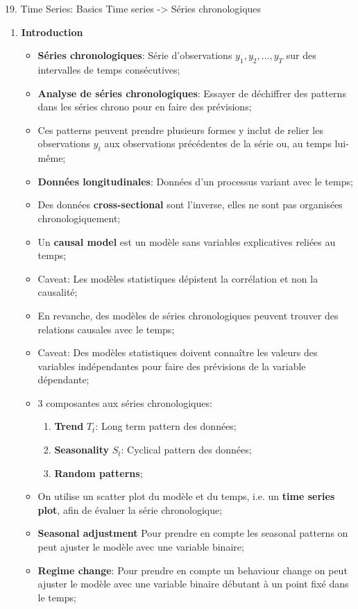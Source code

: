 \documentclass[12pt, titlepage, french]{report}
\begin{document}
\begin{CHPT_SUMM}{19. Time Series: Basics}
Time series -> Séries chronologiques
\begin{enumerate}
	\item	\textbf{Introduction}
	\begin{itemize}
		\item	\textbf{Séries chronologiques}: Série d'observations $y_{1}, y_{2}, \dots, y_{T}$ sur des intervalles de temps consécutives;
		\item	\textbf{Analyse de séries chronologiques}: Essayer de déchiffrer des patterns dans les séries chrono pour en faire des prévisions;
		\item[]	Ces patterns peuvent prendre plusieurs formes y inclut de relier les observations $y_{t}$ aux observations précédentes de la série ou, au temps lui-même;
		\item	\textbf{Données longitudinales}: Données d'un processus variant avec le temps;
		\item	Des données \textbf{cross-sectional} sont l'inverse, elles ne sont pas organisées chronologiquement;
		\item	Un \textbf{causal model} est un modèle sans variables explicatives reliées au temps;
		\item[]	Caveat: Les modèles statistiques dépistent la corrélation et non la causalité;
		\item[]	En revanche, des modèles de séries chronologiques peuvent trouver des relations causales avec le temps;
		\item[]	Caveat: Des modèles statistiques doivent connaître les valeurs des variables indépendantes pour faire des prévisions de la variable dépendante;
		\item	3 composantes aux séries chronologiques:
		\begin{enumerate}
			\item	\textbf{Trend} $T_{t}$: Long term pattern des données;
			\item	\textbf{Seasonality} $S_{t}$: Cyclical pattern des données;
			\item	\textbf{Random patterns};
		\end{enumerate}	
		\item	On utilise un scatter plot du modèle et du temps, i.e. un \textbf{time series plot}, afin de évaluer la série chronologique;
		\item[]	\textbf{Seasonal adjustment} Pour prendre en compte les seasonal patterns on peut ajuster le modèle avec une variable binaire;
		\item	\textbf{Regime change}: Pour prendre en compte un behaviour change on peut ajuster le modèle avec une variable binaire débutant à un point fixé dans le temps;

\end{itemize}
\end{enumerate}
\end{CHPT_SUMM}
\end{document}
